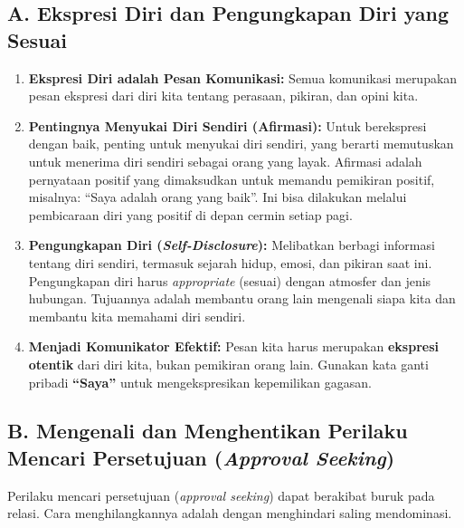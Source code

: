 \documentclass[
  letterpaper,
  DIV=11,
  numbers=noendperiod]{scrreprt}
\providecommand{\tightlist}{%
  \setlength{\itemsep}{0pt}\setlength{\parskip}{0pt}}
\begin{document}
\subsection{A. Ekspresi Diri dan Pengungkapan Diri yang
Sesuai}\label{a.-ekspresi-diri-dan-pengungkapan-diri-yang-sesuai}

\begin{enumerate}
\def\labelenumi{\arabic{enumi}.}
\tightlist
\item
  \textbf{Ekspresi Diri adalah Pesan Komunikasi:} Semua komunikasi
  merupakan pesan ekspresi dari diri kita tentang perasaan, pikiran, dan
  opini kita.
\item
  \textbf{Pentingnya Menyukai Diri Sendiri (Afirmasi):} Untuk
  berekspresi dengan baik, penting untuk menyukai diri sendiri, yang
  berarti memutuskan untuk menerima diri sendiri sebagai orang yang
  layak. Afirmasi adalah pernyataan positif yang dimaksudkan untuk
  memandu pemikiran positif, misalnya: ``Saya adalah orang yang baik''.
  Ini bisa dilakukan melalui pembicaraan diri yang positif di depan
  cermin setiap pagi.
\item
  \textbf{Pengungkapan Diri (\emph{Self-Disclosure}):} Melibatkan
  berbagi informasi tentang diri sendiri, termasuk sejarah hidup, emosi,
  dan pikiran saat ini. Pengungkapan diri harus \emph{appropriate}
  (sesuai) dengan atmosfer dan jenis hubungan. Tujuannya adalah membantu
  orang lain mengenali siapa kita dan membantu kita memahami diri
  sendiri.
\item
  \textbf{Menjadi Komunikator Efektif:} Pesan kita harus merupakan
  \textbf{ekspresi otentik} dari diri kita, bukan pemikiran orang lain.
  Gunakan kata ganti pribadi \textbf{``Saya''} untuk mengekspresikan
  kepemilikan gagasan.
\end{enumerate}

\subsection{\texorpdfstring{B. Mengenali dan Menghentikan Perilaku
Mencari Persetujuan (\emph{Approval
Seeking})}{B. Mengenali dan Menghentikan Perilaku Mencari Persetujuan (Approval Seeking)}}\label{b.-mengenali-dan-menghentikan-perilaku-mencari-persetujuan-approval-seeking}

Perilaku mencari persetujuan (\emph{approval seeking}) dapat berakibat
buruk pada relasi. Cara menghilangkannya adalah dengan menghindari
saling mendominasi.
\end{document}
